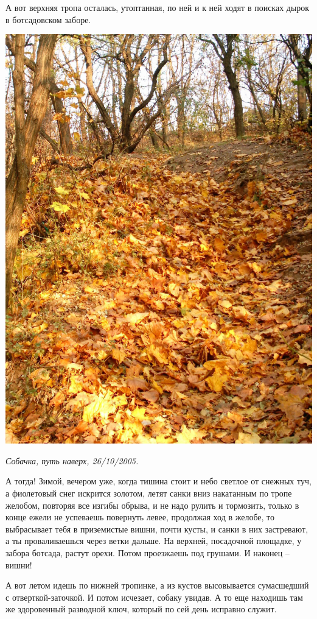 А вот верхняя тропа осталась, утоптанная, по ней и к ней ходят в поисках дырок в ботсадовском заборе.

\begin{center}
\includegraphics[width=0.85\linewidth]{chast-colebanie-osnov/nachalo/sob-imag0038.jpg}

\textit{Собачка, путь наверх, 26/10/2005.} 
\end{center}

А тогда! Зимой, вечером уже, когда тишина стоит и небо светлое от снежных туч, а фиолетовый снег искрится золотом, летят санки вниз накатанным по тропе желобом, повторяя все изгибы обрыва, и не надо рулить и тормозить, только в конце ежели не успеваешь повернуть левее, продолжая ход в желобе, то выбрасывает тебя в приземистые вишни, почти кусты, и санки в них застревают, а ты проваливаешься через ветки дальше. На верхней, посадочной площадке, у забора ботсада, растут орехи. Потом проезжаешь под грушами. И наконец – вишни!

А вот летом идешь по нижней тропинке, а из кустов высовывается сумасшедший с отверткой-заточкой. И потом исчезает, собаку увидав. А то еще находишь там же здоровенный разводной ключ, который по сей день исправно служит.

